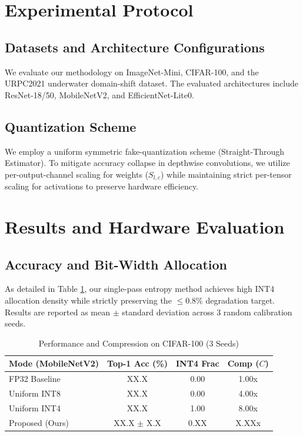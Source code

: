 \documentclass[journal]{IEEEtran}
\begin{document}
\section{Experimental Protocol}
\subsection{Datasets and Architecture Configurations}
We evaluate our methodology on ImageNet-Mini, CIFAR-100, and the URPC2021 underwater domain-shift dataset. The evaluated architectures include ResNet-18/50, MobileNetV2, and EfficientNet-Lite0. 

\subsection{Quantization Scheme}
We employ a uniform symmetric fake-quantization scheme (Straight-Through Estimator). To mitigate accuracy collapse in depthwise convolutions, we utilize per-output-channel scaling for weights ($S_{l,c}$) while maintaining strict per-tensor scaling for activations to preserve hardware efficiency.

\section{Results and Hardware Evaluation}

\subsection{Accuracy and Bit-Width Allocation}
As detailed in Table \ref{tab:main_results}, our single-pass entropy method achieves high INT4 allocation density while strictly preserving the $\le 0.8\%$ degradation target. Results are reported as mean $\pm$ standard deviation across 3 random calibration seeds.

\begin{table}[htbp]
\caption{Performance and Compression on CIFAR-100 (3 Seeds)}
\begin{center}
\begin{tabular}{|l|c|c|c|}
\hline
\textbf{Mode (MobileNetV2)} & \textbf{Top-1 Acc (\%)} & \textbf{INT4 Frac} & \textbf{Comp ($C$)} \\
\hline
FP32 Baseline & XX.X & 0.00 & 1.00x \\
Uniform INT8 & XX.X & 0.00 & 4.00x \\
Uniform INT4 & XX.X & 1.00 & 8.00x \\
Proposed (Ours) & XX.X $\pm$ X.X & 0.XX & X.XXx \\
\hline
\end{tabular}
\label{tab:main_results}
\end{center}
\end{table}
\end{document}
